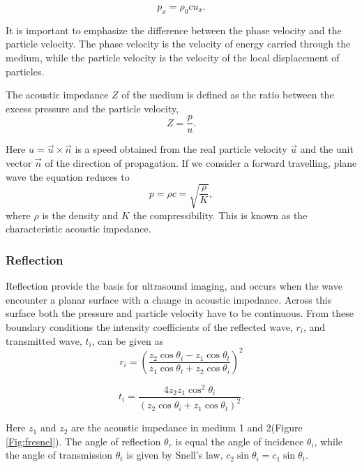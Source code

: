 \begin{equation}
\label{pressure wave}
p_x = \rho_0 c u_x.
\end{equation}

It is important to emphasize the difference between the phase velocity and the particle velocity. The phase velocity is the velocity of energy carried through the medium, while the particle velocity is the velocity of the local displacement of particles.

The acoustic impedance $Z$ of the medium is defined as the ratio between the excess pressure and the particle velocity,
\begin{equation}
\label{acoustic impedance}
 Z = \frac{p}{u}.
\end{equation}
 
Here $u = \vec{u}\times \vec{n}$ is a speed obtained from the real particle velocity $\vec{u}$ and the unit vector $\vec{n}$ of the direction of propagation. If we consider a forward travelling, plane wave the equation reduces to 
\begin{equation}
p = \rho c = \sqrt{\frac{\rho}{K}},
\end{equation}
 where $\rho$ is the density and $K$ the compressibility\cite{Healey2012}. This is known as the characteristic acoustic impedance.
\subsubsection{Reflection}
Reflection provide the basis for ultrasound imaging, and occurs when the wave encounter a planar surface with a change in acoustic impedance. Across this surface both the pressure and particle velocity have to be continuous. From these boundary conditions 
the intensity coefficients of the reflected wave, $r_i$, and transmitted wave, $t_i$, can be given as \cite{wells1969physical}
\begin{equation}
\label{fresnel}
r_i = \left(\frac{z_2 \cos \theta_i - z_1 \cos \theta_t}{z_1 \cos \theta_t + z_2 \cos \theta_i}\right)^2
\end{equation}

\begin{equation}
\label{fresnel2}
t_i = \frac{4z_2 z_1 \cos^2 \theta_i}{(z_2 \cos \theta_i + z_1 \cos \theta_t)^2}.
\end{equation}

Here $z_1$ and $z_2$ are the acoustic impedance in medium 1 and 2(Figure \ref{Fig:fresnel}). The angle of reflection $\theta_r$ is equal the angle of incidence $\theta_i$, while the angle of transmission $\theta_t$ is given by Snell's law\cite{blackstock2000fundamentals}, $ c_2 \sin \theta_i = c_1 \sin \theta_t$. 

